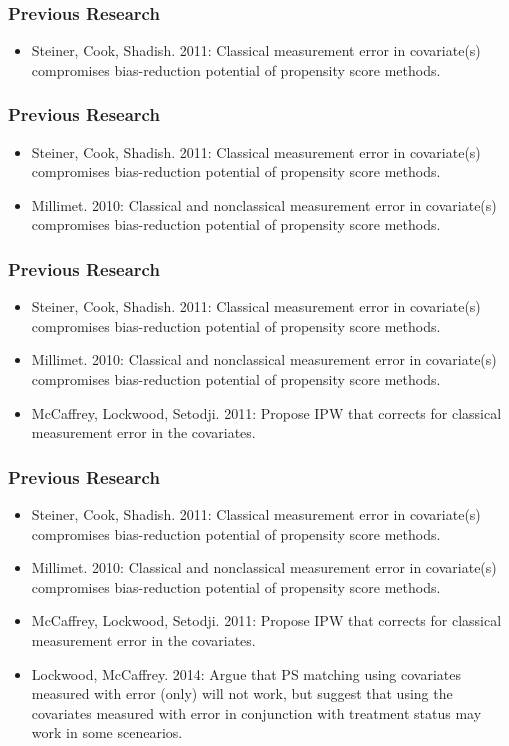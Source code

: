 \documentclass{beamer}
\begin{document}
\begin{frame}

\frametitle{ Previous Research}

\begin{itemize}
\item Steiner, Cook, Shadish. 2011: Classical measurement error in covariate(s) compromises bias-reduction potential of propensity score methods.
\end{itemize}
\end{frame} 

\begin{frame}

\frametitle{ Previous Research}

\begin{itemize}
\item Steiner, Cook, Shadish. 2011: Classical measurement error in covariate(s) compromises bias-reduction potential of propensity score methods.
\item Millimet. 2010: Classical and nonclassical measurement error in covariate(s) compromises bias-reduction potential of propensity score methods. 
\end{itemize}
\end{frame} 

\begin{frame}

\frametitle{ Previous Research}

\begin{itemize}
\item Steiner, Cook, Shadish. 2011: Classical measurement error in covariate(s) compromises bias-reduction potential of propensity score methods.
\item Millimet. 2010: Classical and nonclassical measurement error in covariate(s) compromises bias-reduction potential of propensity score methods. 
\item McCaffrey, Lockwood, Setodji. 2011: Propose IPW that corrects for classical measurement error in the covariates.
\end{itemize}
\end{frame} 

\begin{frame}

\frametitle{ Previous Research}

\begin{itemize}
\item Steiner, Cook, Shadish. 2011: Classical measurement error in covariate(s) compromises bias-reduction potential of propensity score methods.
\item Millimet. 2010: Classical and nonclassical measurement error in covariate(s) compromises bias-reduction potential of propensity score methods. 
\item McCaffrey, Lockwood, Setodji. 2011: Propose IPW that corrects for classical measurement error in the covariates.
\item Lockwood, McCaffrey. 2014: Argue that PS matching using covariates measured with error (only) will not work, but suggest that using the covariates measured with error in conjunction with treatment status may work in some scenearios.
\end{itemize}
\end{frame} 
\end{document}
